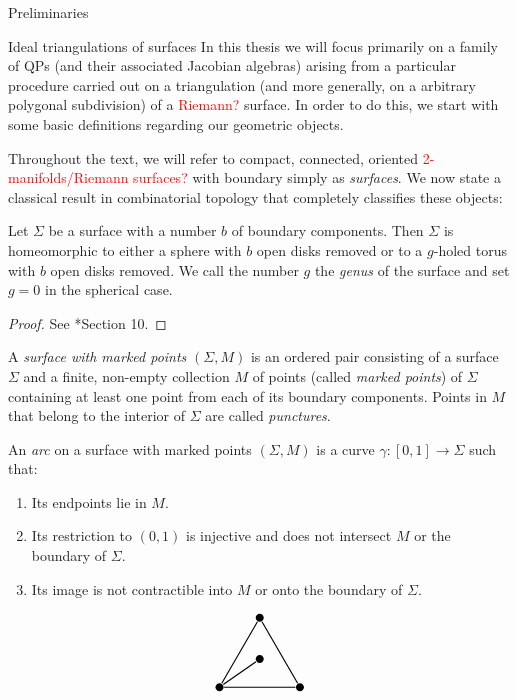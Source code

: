 \begin{chapter}{Preliminaries}
\begin{section}{Ideal triangulations of surfaces}
In this thesis we will focus primarily on a family of QPs (and their associated Jacobian algebras) arising from a particular procedure carried out on a triangulation (and more generally, on a arbitrary polygonal subdivision) of a \textcolor{red}{Riemann?} surface. In order to do this, we start with some basic definitions regarding our geometric objects.

Throughout the text, we will refer to compact, connected, oriented \textcolor{red}{2-manifolds/Riemann surfaces?} with boundary simply as \emph{surfaces}. We now state a classical result in combinatorial topology that completely classifies these objects:

\begin{prop}\label{surf-classification} Let $\Sigma$ be a surface with a number $b$ of boundary components. Then $\Sigma$ is homeomorphic to either a sphere with $b$ open disks removed or to a $g$-holed torus with $b$ open disks removed. We call the number $g$ the \emph{genus} of the surface and set $g=0$ in the spherical case.
\end{prop}
\begin{proof} See \cite{Mas77}*{Section 10}.
\end{proof}

A \emph{surface with marked points} $(\Sigma,M)$ is an ordered pair consisting of a surface $\Sigma$ and a finite, non-empty collection $M$ of points (called \emph{marked points}) of $\Sigma$ containing at least one point from each of its boundary components. Points in $M$ that belong to the interior of $\Sigma$ are called \emph{punctures}.

An \emph{arc} on a surface with marked points $(\Sigma, M)$ is a curve $\gamma:[0,1]\to \Sigma$ such that:
\begin{enumerate}
\item Its endpoints lie in $M$.
\item Its restriction to $(0,1)$ is injective and does not intersect $M$ or the boundary of $\Sigma$.
\item Its image is not contractible into $M$ or onto the boundary of $\Sigma$.
\end{enumerate}
\begin{figure}[h]
\[
\begin{tikzpicture}[thick]
\tikzstyle{every node} = [circle, fill=black, minimum size=.2cm, inner sep=0cm]
\node (se1) at (0,0) {};
\node (sw1) at (2,0) {}
	edge (se1);
\node (n1) at (1,1.73) {}
	edge (se1)
	edge (sw1);
\node (c1) at (1,0.7) {}
	edge (se1);


\end{tikzpicture}\]
\end{figure}
\end{section}
\end{chapter}
